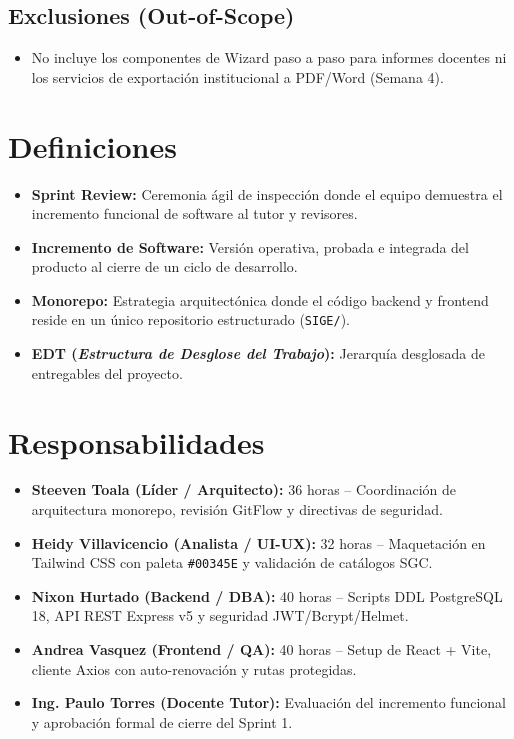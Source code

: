 \documentclass[12pt,a4paper]{article}
\begin{document}
\subsection{Exclusiones (Out-of-Scope)}
\begin{itemize}[leftmargin=1.5em, itemsep=1.5pt]
    \item No incluye los componentes de Wizard paso a paso para informes docentes ni los servicios de exportación institucional a PDF/Word (Semana 4).
\end{itemize}

\section{Definiciones}
\begin{itemize}[leftmargin=1.5em, itemsep=2pt, topsep=2pt]
    \item \textbf{Sprint Review:} Ceremonia ágil de inspección donde el equipo demuestra el incremento funcional de software al tutor y revisores.
    \item \textbf{Incremento de Software:} Versión operativa, probada e integrada del producto al cierre de un ciclo de desarrollo.
    \item \textbf{Monorepo:} Estrategia arquitectónica donde el código backend y frontend reside en un único repositorio estructurado (\texttt{SIGE/}).
    \item \textbf{EDT (\textit{Estructura de Desglose del Trabajo}):} Jerarquía desglosada de entregables del proyecto.
\end{itemize}

\section{Responsabilidades}
\begin{itemize}[leftmargin=1.5em, itemsep=2pt, topsep=2pt]
    \item \textbf{Steeven Toala (Líder / Arquitecto):} 36 horas -- Coordinación de arquitectura monorepo, revisión GitFlow y directivas de seguridad.
    \item \textbf{Heidy Villavicencio (Analista / UI-UX):} 32 horas -- Maquetación en Tailwind CSS con paleta \texttt{\#00345E} y validación de catálogos SGC.
    \item \textbf{Nixon Hurtado (Backend / DBA):} 40 horas -- Scripts DDL PostgreSQL 18, API REST Express v5 y seguridad JWT/Bcrypt/Helmet.
    \item \textbf{Andrea Vasquez (Frontend / QA):} 40 horas -- Setup de React + Vite, cliente Axios con auto-renovación y rutas protegidas.
    \item \textbf{Ing. Paulo Torres (Docente Tutor):} Evaluación del incremento funcional y aprobación formal de cierre del Sprint 1.
\end{itemize}
\end{document}
